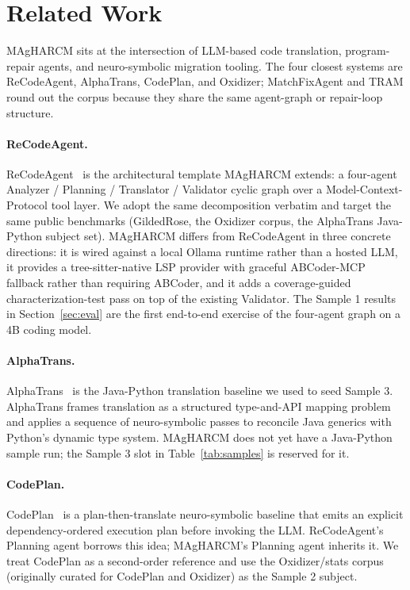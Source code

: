 \section{Related Work}
\label{sec:related}

MAgHARCM sits at the intersection of LLM-based code translation,
program-repair agents, and neuro-symbolic migration tooling. The four
closest systems are ReCodeAgent, AlphaTrans, CodePlan, and Oxidizer;
MatchFixAgent and TRAM round out the corpus because they share the
same agent-graph or repair-loop structure.

\paragraph{ReCodeAgent.}
ReCodeAgent~\citep{ibrahimzada2025recodeagent} is the architectural
template MAgHARCM extends: a four-agent Analyzer / Planning /
Translator / Validator cyclic graph over a Model-Context-Protocol tool
layer. We adopt the same decomposition verbatim and target the same
public benchmarks (GildedRose, the Oxidizer corpus, the AlphaTrans
Java-Python subject set). MAgHARCM differs from ReCodeAgent in three
concrete directions: it is wired against a local Ollama runtime rather
than a hosted LLM, it provides a tree-sitter-native LSP provider with
graceful ABCoder-MCP fallback rather than requiring ABCoder, and it
adds a coverage-guided characterization-test pass on top of the
existing Validator. The Sample 1 results in Section~\ref{sec:eval} are
the first end-to-end exercise of the four-agent graph on a 4B coding
model.

\paragraph{AlphaTrans.}
AlphaTrans~\citep{alphatrans2025} is the Java-Python translation
baseline we used to seed Sample 3. AlphaTrans frames translation as a
structured type-and-API mapping problem and applies a sequence of
neuro-symbolic passes to reconcile Java generics with Python's dynamic
type system. MAgHARCM does not yet have a Java-Python sample run; the
Sample 3 slot in Table~\ref{tab:samples} is reserved for it.

\paragraph{CodePlan.}
CodePlan~\citep{codeplan2023} is a plan-then-translate neuro-symbolic baseline that emits
an explicit dependency-ordered execution plan before invoking the
LLM. ReCodeAgent's Planning agent borrows this idea; MAgHARCM's
Planning agent inherits it. We treat CodePlan as a second-order
reference and use the Oxidizer/stats corpus (originally curated for
CodePlan and Oxidizer) as the Sample 2 subject.

